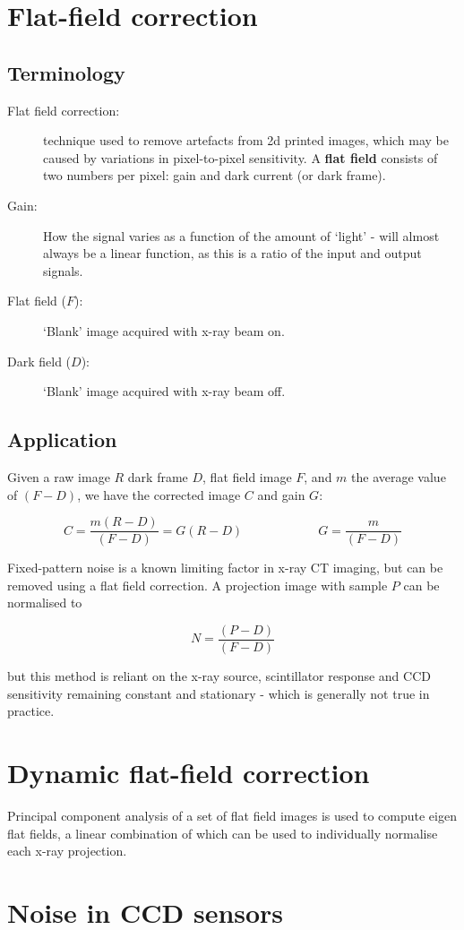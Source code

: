 \documentclass[10pt,fleqn]{article}
\begin{document}
\section{Flat-field correction \cite{wiki:FlatFieldCorrection}}

\subsection{Terminology}

\begin{description}
\item[Flat field correction: ]
 technique used to remove artefacts from 2d printed images, which may be caused by variations in pixel-to-pixel sensitivity. A \textbf{flat field} consists of two numbers per pixel: gain and dark current (or dark frame).

\item[Gain: ] How the signal varies as a function of the amount of `light' - will almost always be a linear function, as this is a ratio of the input and output signals.

\item[Flat field ($F$): ] `Blank' image acquired with x-ray beam on.

\item[Dark field ($D$): ] `Blank' image acquired with x-ray beam off.

\end{description}

\subsection{Application}
Given a raw image $R$ dark frame $D$, flat field image $F$, and $m$ the average value of $(F-D)$, we have the corrected image $C$ and gain $G$:

\[ C = \frac{m(R-D)}{(F-D)} = G(R-D) \qquad \qquad \qquad G = \frac{m}{(F-D)}\]

Fixed-pattern noise is a known limiting factor in x-ray CT imaging, but can be removed using a flat field correction. A projection image with sample $P$ can be normalised to 

\[N = \frac{(P-D)}{(F-D)} \]

but this method is reliant on the x-ray source, scintillator response and CCD sensitivity remaining constant and stationary - which is generally not true in practice.

\section{Dynamic flat-field correction \cite{vanN2015}}
Principal component analysis of a set of flat field images is used to compute eigen flat fields, a linear combination of which can be used to individually normalise each x-ray projection.

\section{Noise in CCD sensors \cite{CCD-noise:2009}}

\hrulefill
\printbibliography
\end{document}
